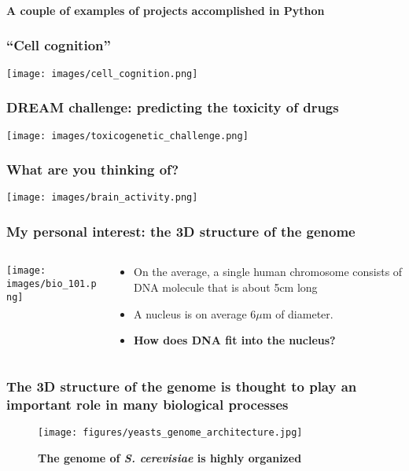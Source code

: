 \documentclass[xcolor=dvipsnames]{beamer}
\begin{document}
\begin{frame}
\frametitle{}
{\Large \bf A couple of examples of projects accomplished in Python}
\end{frame}

\begin{frame}
\frametitle{``Cell cognition''}
\begin{center}
\texttt{[image: images/cell\_cognition.png]}
\end{center}
\end{frame}

\begin{frame}
\frametitle{DREAM challenge: predicting the toxicity of drugs}
\begin{center}
\texttt{[image: images/toxicogenetic\_challenge.png]}
\end{center}
\end{frame}

\begin{frame}
\frametitle{What are you thinking of?}
\begin{center}
\texttt{[image: images/brain\_activity.png]}
\end{center}
\end{frame}


\begin{frame}
\frametitle{My personal interest: the 3D structure of the genome}
\begin{columns}
\begin{column}{0.45\linewidth}
\texttt{[image: images/bio\_101.png]}
\end{column}
\begin{column}{0.45\linewidth}
\begin{itemize}[label={$\bullet$}]
\item On the average, a single human chromosome consists of DNA molecule that is about 5cm long
\item A nucleus is on average 6$\mu$m of diameter.
\item {\bf \color{Blue} How does DNA fit into the nucleus?}
\end{itemize}
\end{column}
\end{columns}
\end{frame}

\begin{frame}
\frametitle{The 3D structure of the genome is thought to play an important
role in many biological processes}
\vspace{-0.6em}
\begin{figure}
\begin{center}
\texttt{[image: figures/yeasts\_genome\_architecture.jpg]}
\end{center}
\caption{\textbf{The genome of \textit{S. cerevisiae} is highly organized}
         \citep{zimmer:principles}}
\end{figure}
\end{frame}
\end{document}
